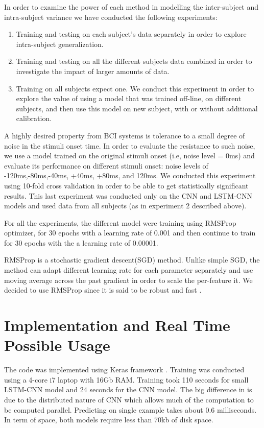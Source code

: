 \documentclass[
12pt, %
english, %
doublespacing, %
headsepline, %
]{MastersDoctoralThesis} %
\begin{document}
								
In order to examine the power of each method in modelling the inter-subject and  intra-subject variance we have conducted the following experiments:
\begin{enumerate}
	\item Training and testing on each subject's data separately in order to explore intra-subject generalization.
	\item Training and testing on all the different subjects data combined in order to investigate the impact of larger amounts of data.
	\item Training on all subjects expect one. We conduct this experiment in order to explore the value of using a model that was trained off-line, on different subjects, and then use this model on new subject, with or without additional calibration.
\end{enumerate}
									
A highly desired property from BCI systems is tolerance to a small degree of noise in the stimuli onset time.  In order to evaluate the resistance to such noise, we use a model trained on the original stimuli onset (i.e, noise level = 0ms) and evaluate its performance on different stimuli onset: noise levels of -120ms,-80ms,-40ms, +40ms, +80ms, and 120ms. We conducted this experiment using 10-fold cross validation in order to be able to get statistically significant results. This last experiment was conducted only on the CNN and LSTM-CNN models and used data from all subjects (as in experiment 2 described above).

For all the experiments, the different model were training using RMSProp~\cite{tieleman2012lecture} optimizer, for 30 epochs with a learning rate of 0.001 and then continue to train for 30 epochs with the a learning rate of 0.00001.


RMSProp \cite{tieleman2012lecture} is a stochastic gradient descent(SGD) method. Unlike simple SGD, the method can adapt different learning rate for each parameter separately and use moving average across the past gradient in order to scale the per-feature it. We decided to use RMSProp since it is said to be robust and fast \cite{xu2015show, karpathy2015deep, szegedy2016rethinking}.


\section{Implementation and Real Time Possible Usage}
The code was implemented using Keras framework \cite{chollet2015keras}. Training was conducted using a 4-core i7 laptop with 16Gb RAM. Training took 110 seconds for small LSTM-CNN model and 24 seconds for the CNN model. The big difference in is due to the distributed nature of  CNN which allows much of the computation to be computed parallel. Predicting on single example takes about 0.6 milliseconds. In term of space, both models require less than 70kb of disk space.
\end{document}

